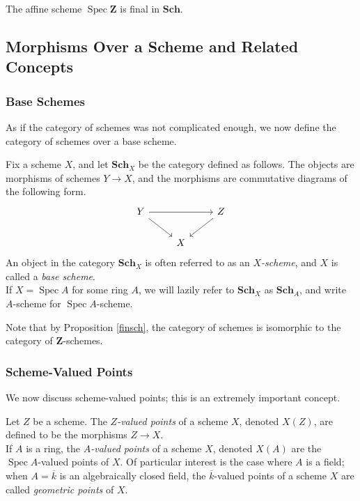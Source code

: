 \documentclass[11pt,openany]{book} %
\newcommand{\Z}{\mathbf{Z}}
\newcommand{\spc}{\operatorname{Spec}}
\begin{document}
\begin{proposition} \label{finsch}
The affine scheme $\spc \Z$ is final in $\mathbf{Sch}$.
\end{proposition}


\subsection{Morphisms Over a Scheme and Related Concepts}

\subsubsection{Base Schemes}
As if the category of schemes was not complicated enough, we now define the category of schemes over a base scheme.\\

\begin{definition}
Fix a scheme $X$, and let $\mathbf{Sch}_X$ be the category defined as follows. The objects are morphisms of schemes $Y \to X$, and the morphisms are commutative diagrams of the following form.
\[
\begin{tikzcd}
Y \ar[rr] \ar[rd] & & Z \ar[ld] \\
& X
\end{tikzcd}
\]
An object in the category $\mathbf{Sch}_X$ is often referred to as an \emph{$X$-scheme}, and $X$ is called a \emph{base scheme}.\\

If $X = \spc A$ for some ring $A$, we will lazily refer to $\mathbf{Sch}_X$ as $\mathbf{Sch}_A$, and write $A$-scheme for $\spc A$-scheme.
\end{definition}

Note that by Proposition \ref{finsch}, the category of schemes is isomorphic to the category of $\Z$-schemes.

\subsubsection{Scheme-Valued Points}
We now discuss scheme-valued points; this is an extremely important concept.\\

\begin{definition}
Let $Z$ be a scheme. The \emph{$Z$-valued points} of a scheme $X$, denoted $X(Z)$, are defined to be the morphisms $Z \to X$.\\

If $A$ is a ring, the \emph{$A$-valued points} of a scheme $X$, denoted $X(A)$ are the $\spc A$-valued points of $X$. Of particular interest is the case where $A$ is a field; when $A = \overline{k}$ is an algebraically closed field, the $\overline{k}$-valued points of a scheme $X$ are called \emph{geometric points} of $X$.
\end{definition}
\end{document}
